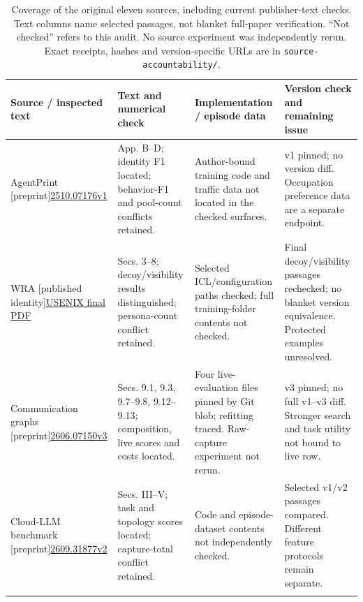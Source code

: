 \begin{table}[!tp]\centering\footnotesize
\caption{Coverage of the original eleven sources, including current publisher-text checks. Text columns name selected passages, not blanket full-paper verification. ``Not checked'' refers to this audit. No source experiment was independently rerun. Exact receipts, hashes and version-specific URLs are in \texttt{source-accountability/}.}
\label{tab:check-coverage}
\renewcommand{\arraystretch}{1.12}
\begin{tabularx}{\textwidth}{@{}P{.19\textwidth}P{.29\textwidth}P{.27\textwidth}Y@{}}\toprule
Source / inspected text & Text and numerical check & Implementation / episode data & Version check and remaining issue \\\midrule
AgentPrint [preprint]\newline\href{https://arxiv.org/abs/2510.07176v1}{2510.07176v1}
& App. B--D; identity F1 located; behavior-F1 and pool-count conflicts retained.
& Author-bound training code and traffic data not located in the checked surfaces.
& v1 pinned; no version diff. Occupation preference data are a separate endpoint. \\\addlinespace[4pt]
WRA [published identity]\newline\href{https://www.usenix.org/system/files/usenixsecurity26-jeong.pdf}{USENIX final PDF}
& Secs. 3--8; decoy/visibility results distinguished; persona-count conflict retained.
& Selected ICL/configuration paths checked; full training-folder contents not checked.
& Final decoy/visibility passages rechecked; no blanket version equivalence. Protected examples unresolved. \\\addlinespace[4pt]
Communication graphs [preprint]\newline\href{https://arxiv.org/abs/2606.07150v3}{2606.07150v3}
& Secs. 9.1, 9.3, 9.7--9.8, 9.12--9.13; composition, live scores and costs located.
& Four live-evaluation files pinned by Git blob; refitting traced. Raw-capture experiment not rerun.
& v3 pinned; no full v1--v3 diff. Stronger search and task utility not bound to live row. \\\addlinespace[4pt]
Cloud-LLM benchmark [preprint]\newline\href{https://arxiv.org/abs/2609.31877v2}{2609.31877v2}
& Secs. III--V; task and topology scores located; capture-total conflict retained.
& Code and episode-dataset contents not independently checked.
& Selected v1/v2 passages compared. Different feature protocols remain separate. \\\addlinespace[4pt]

\end{tabularx}
\end{table}
